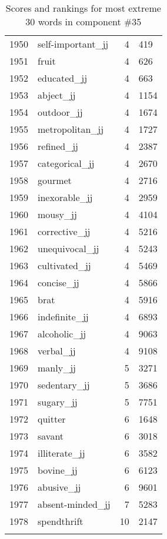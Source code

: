 \begin{longtable}[!htbp]{| rlr@{.}l |}
    1950 & self-important\_jj & 4 & 419 \\
    1951 & fruit & 4 & 626 \\
    1952 & educated\_jj & 4 & 663 \\
    1953 & abject\_jj & 4 & 1154 \\
    1954 & outdoor\_jj & 4 & 1674 \\
    1955 & metropolitan\_jj & 4 & 1727 \\
    1956 & refined\_jj & 4 & 2387 \\
    1957 & categorical\_jj & 4 & 2670 \\
    1958 & gourmet & 4 & 2716 \\
    1959 & inexorable\_jj & 4 & 2959 \\
    1960 & mousy\_jj & 4 & 4104 \\
    1961 & corrective\_jj & 4 & 5216 \\
    1962 & unequivocal\_jj & 4 & 5243 \\
    1963 & cultivated\_jj & 4 & 5469 \\
    1964 & concise\_jj & 4 & 5866 \\
    1965 & brat & 4 & 5916 \\
    1966 & indefinite\_jj & 4 & 6893 \\
    1967 & alcoholic\_jj & 4 & 9063 \\
    1968 & verbal\_jj & 4 & 9108 \\
    1969 & manly\_jj & 5 & 3271 \\
    1970 & sedentary\_jj & 5 & 3686 \\
    1971 & sugary\_jj & 5 & 7751 \\
    1972 & quitter & 6 & 1648 \\
    1973 & savant & 6 & 3018 \\
    1974 & illiterate\_jj & 6 & 3582 \\
    1975 & bovine\_jj & 6 & 6123 \\
    1976 & abusive\_jj & 6 & 9601 \\
    1977 & absent-minded\_jj & 7 & 5283 \\
    1978 & spendthrift & 10 & 2147 \\
    \hline
    \caption{Scores and rankings for most extreme 30 words in component \#35} \\
\end{longtable}
